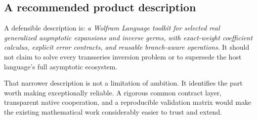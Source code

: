 \subsection{A recommended product description}
A defensible description is: \emph{a Wolfram Language toolkit for selected real generalized asymptotic expansions and inverse germs, with exact-weight coefficient calculus, explicit error contracts, and reusable branch-aware operations}. It should not claim to solve every transseries inversion problem or to supersede the host language's full asymptotic ecosystem.

That narrower description is not a limitation of ambition. It identifies the part worth making exceptionally reliable. A rigorous common contract layer, transparent native cooperation, and a reproducible validation matrix would make the existing mathematical work considerably easier to trust and extend.
